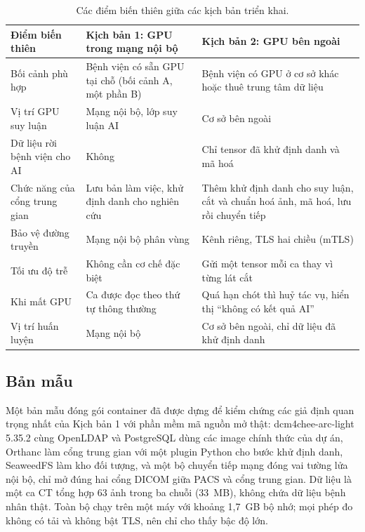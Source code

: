 \begin{table}[H]
\centering
\small
\begin{tabularx}{\textwidth}{@{}p{3.6cm} Y Y@{}}
\toprule
\textbf{Điểm biến thiên} & \textbf{Kịch bản 1: GPU trong mạng nội bộ} & \textbf{Kịch bản 2: GPU bên ngoài} \\
\midrule
Bối cảnh phù hợp & Bệnh viện có sẵn GPU tại chỗ (bối cảnh A, một phần B) & Bệnh viện có GPU ở cơ sở khác hoặc thuê trung tâm dữ liệu \\
Vị trí GPU suy luận & Mạng nội bộ, lớp suy luận AI & Cơ sở bên ngoài \\
Dữ liệu rời bệnh viện cho AI & Không & Chỉ tensor đã khử định danh và mã hoá \\
Chức năng của cổng trung gian & Lưu bản làm việc, khử định danh cho nghiên cứu & Thêm khử định danh cho suy luận, cắt và chuẩn hoá ảnh, mã hoá, lưu rồi chuyển tiếp \\
Bảo vệ đường truyền & Mạng nội bộ phân vùng & Kênh riêng, TLS hai chiều (mTLS) \\
Tối ưu độ trễ & Không cần cơ chế đặc biệt & Gửi một tensor mỗi ca thay vì từng lát cắt \\
Khi mất GPU & Ca được đọc theo thứ tự thông thường & Quá hạn chót thì huỷ tác vụ, hiển thị ``không có kết quả AI'' \\
Vị trí huấn luyện & Mạng nội bộ & Cơ sở bên ngoài, chỉ dữ liệu đã khử định danh \\
\bottomrule
\end{tabularx}
\caption{Các điểm biến thiên giữa các kịch bản triển khai.}
\label{tab:scenarios}
\end{table}




\subsection{Bản mẫu}
\label{sec:poc}

Một bản mẫu đóng gói container đã được dựng để kiểm chứng các giả định quan trọng nhất
của Kịch bản 1 với phần mềm mã nguồn mở thật: dcm4chee-arc-light 5.35.2 cùng OpenLDAP
và PostgreSQL dùng các image chính thức của dự án, Orthanc làm cổng trung gian với một
plugin Python cho bước khử định danh, SeaweedFS làm kho đối tượng, và một bộ chuyển tiếp
mạng đóng vai tường lửa nội bộ, chỉ mở đúng hai cổng DICOM giữa PACS và cổng trung gian.
Dữ liệu là một ca CT tổng hợp 63 ảnh trong ba chuỗi (33~MB), không chứa dữ liệu bệnh nhân
thật. Toàn bộ chạy trên một máy với khoảng 1{,}7~GB bộ nhớ; mọi phép đo không có tải và
không bật TLS, nên chỉ cho thấy bậc độ lớn.

